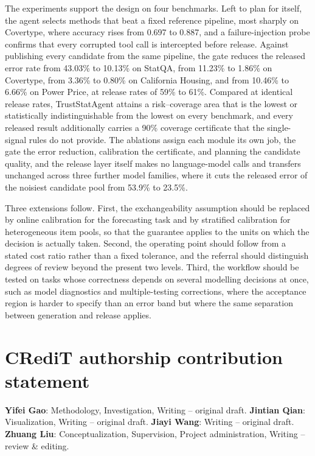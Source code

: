 \documentclass[preprint,12pt,authoryear]{elsarticle}
\begin{document}
The experiments support the design on four benchmarks.
Left to plan for itself, the agent selects methods that beat a fixed reference pipeline, most sharply on Covertype, where accuracy rises from 0.697 to 0.887, and a failure-injection probe confirms that every corrupted tool call is intercepted before release.
Against publishing every candidate from the same pipeline, the gate reduces the released error rate from 43.03\% to 10.13\% on StatQA, from 11.23\% to 1.86\% on Covertype, from 3.36\% to 0.80\% on California Housing, and from 10.46\% to 6.66\% on Power Price, at release rates of 59\% to 61\%.
Compared at identical release rates, TrustStatAgent attains a risk--coverage area that is the lowest or statistically indistinguishable from the lowest on every benchmark, and every released result additionally carries a 90\% coverage certificate that the single-signal rules do not provide.
The ablations assign each module its own job, the gate the error reduction, calibration the certificate, and planning the candidate quality, and the release layer itself makes no language-model calls and transfers unchanged across three further model families, where it cuts the released error of the noisiest candidate pool from 53.9\% to 23.5\%.

Three extensions follow.
First, the exchangeability assumption should be replaced by online calibration for the forecasting task and by stratified calibration for heterogeneous item pools, so that the guarantee applies to the units on which the decision is actually taken.
Second, the operating point should follow from a stated cost ratio rather than a fixed tolerance, and the referral should distinguish degrees of review beyond the present two levels.
Third, the workflow should be tested on tasks whose correctness depends on several modelling decisions at once, such as model diagnostics and multiple-testing corrections, where the acceptance region is harder to specify than an error band but where the same separation between generation and release applies.



\section*{CRediT authorship contribution statement}
\textbf{Yifei Gao}: Methodology, Investigation, Writing -- original draft.
\textbf{Jintian Qian}: Visualization, Writing -- original draft.
\textbf{Jiayi Wang}: Writing -- original draft.
\textbf{Zhuang Liu}: Conceptualization, Supervision, Project administration, Writing -- review \& editing.
\end{document}
